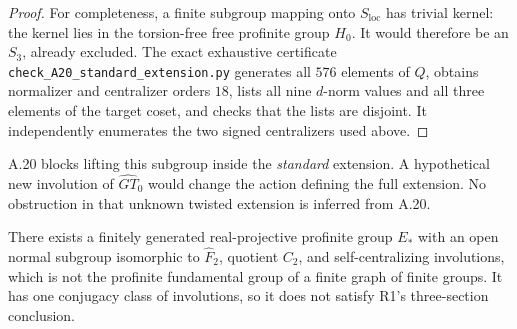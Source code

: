 \begin{proof}
For completeness, a finite subgroup mapping onto
\(S_{\mathrm{loc}}\) has trivial kernel: the kernel lies
in the torsion-free free profinite group \(H_0\).
It would therefore be an \(S_3\), already excluded.
The exact exhaustive certificate
\texttt{check\_A20\_standard\_extension.py} generates all
\(576\) elements of \(Q\), obtains normalizer and
centralizer orders \(18\), lists all nine \(d\)-norm
values and all three elements of the target coset, and
checks that the lists are disjoint. It independently
enumerates the two signed centralizers used above.
\end{proof}

A.20 blocks lifting this subgroup inside the \emph{standard}
extension. A hypothetical new involution of
\(\widehat{GT}_0\) would change the action defining the
full extension. No obstruction in that unknown twisted
extension is inferred from A.20.

There exists a finitely generated real-projective profinite
group \(E_*\) with an open normal subgroup isomorphic to
\(\widehat F_2\), quotient \(C_2\), and self-centralizing
involutions, which is not the profinite fundamental group
of a finite graph of finite groups. It has one conjugacy
class of involutions, so it does not satisfy R1's
three-section conclusion.

